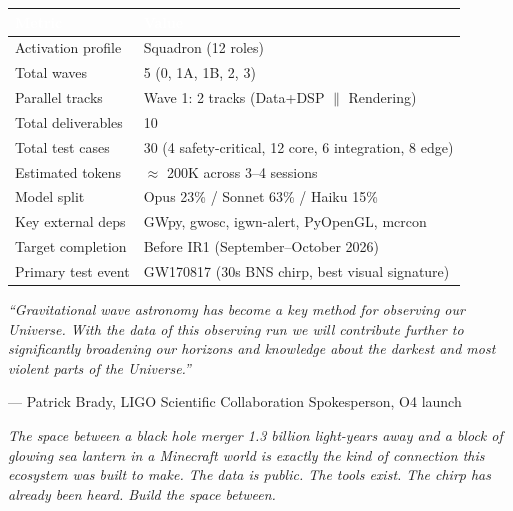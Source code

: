 \documentclass[11pt,letterpaper]{article}
\newcommand{\tableheader}[1]{\textbf{\sffamily\textcolor{white}{#1}}}
\begin{document}
\begin{center}
\begin{tabularx}{\textwidth}{L{4cm}X}
\toprule
{}
\tableheader{Metric} & \tableheader{Value} \\
\midrule
Activation profile & Squadron (12 roles) \\
Total waves & 5 (0, 1A, 1B, 2, 3) \\
Parallel tracks & Wave 1: 2 tracks (Data+DSP $\parallel$ Rendering) \\
Total deliverables & 10 \\
Total test cases & 30 (4 safety-critical, 12 core, 6 integration, 8 edge) \\
Estimated tokens & $\approx$ 200K across 3--4 sessions \\
Model split & Opus 23\% / Sonnet 63\% / Haiku 15\% \\
Key external deps & GWpy, gwosc, igwn-alert, PyOpenGL, mcrcon \\
Target completion & Before IR1 (September--October 2026) \\
Primary test event & GW170817 (30s BNS chirp, best visual signature) \\
\bottomrule
\end{tabularx}
\end{center}

\vspace{2em}

\begin{quotebox}
\textit{``Gravitational wave astronomy has become a key method for observing our Universe. With the data of this observing run we will contribute further to significantly broadening our horizons and knowledge about the darkest and most violent parts of the Universe.''}

\vspace{0.5em}
\hfill --- Patrick Brady, LIGO Scientific Collaboration Spokesperson, O4 launch

\vspace{1em}
\textit{The space between a black hole merger 1.3 billion light-years away and a block of glowing sea lantern in a Minecraft world is exactly the kind of connection this ecosystem was built to make. The data is public. The tools exist. The chirp has already been heard. Build the space between.}
\end{quotebox}
\end{document}
